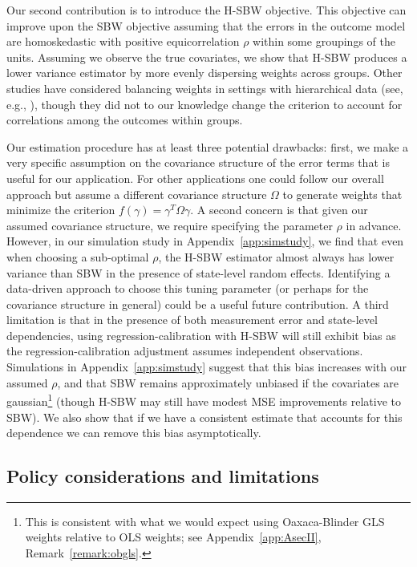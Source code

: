 \documentclass[aoas]{imsart}
\theoremstyle{plain}
\theoremstyle{remark}
\begin{document}
Our second contribution is to introduce the H-SBW objective. This objective can improve upon the SBW objective assuming that the errors in the outcome model are homoskedastic with positive equicorrelation $\rho$ within some groupings of the units. Assuming we observe the true covariates, we show that H-SBW produces a lower variance estimator by more evenly dispersing weights across groups. Other studies have considered balancing weights in settings with hierarchical data (see, e.g., \cite{keele2020hospital}), though they did not to our knowledge change the criterion to account for correlations among the outcomes within groups.

Our estimation procedure has at least three potential drawbacks: first, we make a very specific assumption on the covariance structure of the error terms that is useful for our application. For other applications one could follow our overall approach but assume a different covariance structure $\Omega$ to generate weights that minimize the criterion $f(\gamma) = \gamma^T\Omega\gamma$. A second concern is that given our assumed covariance structure, we require specifying the parameter $\rho$ in advance. However, in our simulation study in Appendix~\ref{app:simstudy}, we find that even when choosing a sub-optimal $\rho$, the H-SBW estimator almost always has lower variance than SBW in the presence of state-level random effects. Identifying a data-driven approach to choose this tuning parameter (or perhaps for the covariance structure in general) could be a useful future contribution. A third limitation is that in the presence of both measurement error and state-level dependencies, using regression-calibration with H-SBW will still exhibit bias as the regression-calibration adjustment assumes independent observations. Simulations in Appendix~\ref{app:simstudy} suggest that this bias increases with our assumed $\rho$, and that SBW remains approximately unbiased if the covariates are gaussian\footnote{This is consistent with what we would expect using Oaxaca-Blinder GLS weights relative to OLS weights; see Appendix~\ref{app:AsecII}, Remark~\ref{remark:obgls}.} (though H-SBW may still have modest MSE improvements relative to SBW). We also show that if we have a consistent estimate that accounts for this dependence we can remove this bias asymptotically.

\subsection{Policy considerations and limitations}
\end{document}
